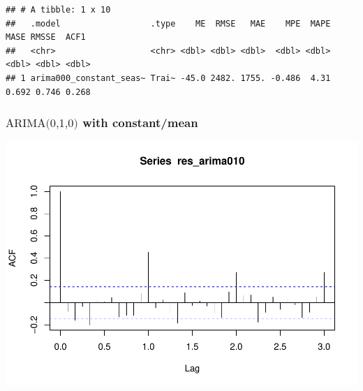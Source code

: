 \documentclass[
]{article}
\newenvironment{Shaded}{\begin{snugshade}}{\end{snugshade}}
\newcommand{\AttributeTok}[1]{\textcolor[rgb]{0.77,0.63,0.00}{#1}}
\newcommand{\CommentTok}[1]{\textcolor[rgb]{0.56,0.35,0.01}{\textit{#1}}}
\newcommand{\DecValTok}[1]{\textcolor[rgb]{0.00,0.00,0.81}{#1}}
\newcommand{\FunctionTok}[1]{\textcolor[rgb]{0.00,0.00,0.00}{#1}}
\newcommand{\NormalTok}[1]{#1}
\newcommand{\OtherTok}[1]{\textcolor[rgb]{0.56,0.35,0.01}{#1}}
\newcommand{\SpecialCharTok}[1]{\textcolor[rgb]{0.00,0.00,0.00}{#1}}
\begin{document}
\begin{verbatim}
## # A tibble: 1 x 10
##   .model                  .type    ME  RMSE   MAE    MPE  MAPE  MASE RMSSE  ACF1
##   <chr>                   <chr> <dbl> <dbl> <dbl>  <dbl> <dbl> <dbl> <dbl> <dbl>
## 1 arima000_constant_seas~ Trai~ -45.0 2482. 1755. -0.486  4.31 0.692 0.746 0.268
\end{verbatim}

\hypertarget{textarima010-with-constantmean}{%
\subsubsection{\texorpdfstring{\(\text{ARIMA(0,1,0)}\) with
constant/mean}{\textbackslash text\{ARIMA(0,1,0)\} with constant/mean}}\label{textarima010-with-constantmean}}

\begin{Shaded}
\end{Shaded}

\includegraphics{eighth_meeting_notes_files/figure-latex/arima010-1.pdf}
\end{document}
